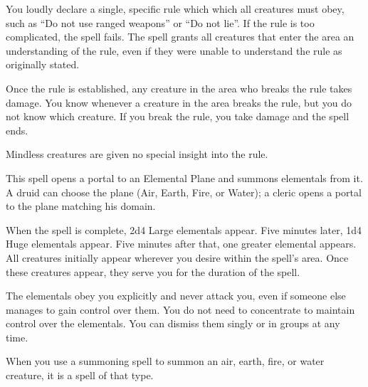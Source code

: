 \spelldur{\durshort}
\begin{spelleffect}
    You loudly declare a single, specific rule which which all creatures must obey, such as ``Do not use ranged weapons'' or ``Do not lie''. If the rule is too complicated, the spell fails. The spell grants all creatures that enter the area an understanding of the rule, even if they were unable to understand the rule as originally stated.

    Once the rule is established, any creature in the area who breaks the rule takes damage. You know whenever a creature in the area breaks the rule, but you do not know which creature. If you break the rule, you take damage and the spell ends.
\end{spelleffect}
\begin{spellnotes}
    Mindless creatures are given no special insight into the rule.
\end{spellnotes}

\spelldur{\durlong \dismissable}
\begin{spelleffect}
    This spell opens a portal to an Elemental Plane and summons elementals from it. A druid can choose the plane (Air, Earth, Fire, or Water); a cleric opens a portal to the plane matching his domain.
    \par When the spell is complete, 2d4 Large elementals appear. Five minutes later, 1d4 Huge elementals appear. Five minutes after that, one greater elemental appears. All creatures initially appear wherever you desire within the spell's area. Once these creatures appear, they serve you for the duration of the spell.
    \par The elementals obey you explicitly and never attack you, even if someone else manages to gain control over them. You do not need to concentrate to maintain control over the elementals. You can dismiss them singly or in groups at any time.
    \par When you use a summoning spell to summon an air, earth, fire, or water creature, it is a spell of that type.
\end{spelleffect}

